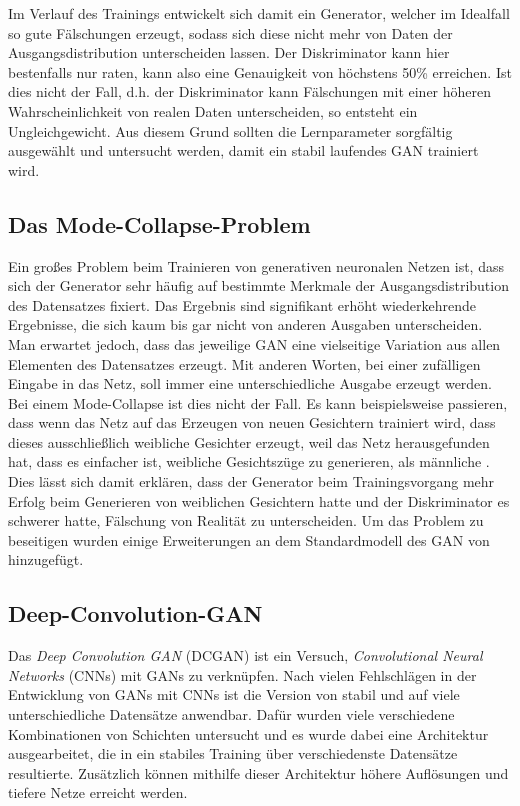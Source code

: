 Im Verlauf des Trainings entwickelt sich damit ein Generator, welcher im
Idealfall so gute Fälschungen erzeugt, sodass sich diese nicht mehr von Daten
der Ausgangsdistribution unterscheiden lassen. Der Diskriminator kann hier
bestenfalls nur raten, kann also eine Genauigkeit von höchstens 50\%
erreichen. Ist dies nicht der Fall, d.h. der Diskriminator kann Fälschungen
mit einer höheren Wahrscheinlichkeit von realen Daten unterscheiden, so
entsteht ein Ungleichgewicht. Aus diesem Grund sollten die Lernparameter
sorgfältig ausgewählt und untersucht werden, damit ein stabil laufendes GAN
trainiert wird.

\subsection{Das Mode-Collapse-Problem}
Ein großes Problem beim Trainieren von generativen neuronalen Netzen ist, dass
sich der Generator sehr häufig auf bestimmte Merkmale der Ausgangsdistribution
des Datensatzes fixiert. Das Ergebnis sind signifikant erhöht wiederkehrende
Ergebnisse, die sich kaum bis gar nicht von anderen Ausgaben unterscheiden.
Man erwartet jedoch, dass das jeweilige GAN eine vielseitige Variation aus
allen Elementen des Datensatzes erzeugt. Mit anderen Worten, bei einer
zufälligen Eingabe in das Netz, soll immer eine unterschiedliche Ausgabe
erzeugt werden. Bei einem Mode-Collapse ist dies nicht der Fall. Es kann
beispielsweise passieren, dass wenn das Netz auf das Erzeugen von neuen
Gesichtern trainiert wird, dass dieses ausschließlich weibliche Gesichter
erzeugt, weil das Netz herausgefunden hat, dass es einfacher ist, weibliche
Gesichtszüge zu generieren, als männliche \cite{richardson2018gans}. Dies
lässt sich damit erklären, dass der Generator beim Trainingsvorgang mehr
Erfolg beim Generieren von weiblichen Gesichtern hatte und der Diskriminator
es schwerer hatte, Fälschung von Realität zu unterscheiden. Um das Problem zu
beseitigen wurden einige Erweiterungen an dem Standardmodell des GAN von
\cite{goodfellow2014generative} hinzugefügt.

\subsection{Deep-Convolution-GAN}
Das \textit{Deep Convolution GAN} (DCGAN) ist ein Versuch,
\textit{Convolutional Neural Networks} (CNNs) mit GANs zu verknüpfen. Nach
vielen Fehlschlägen in der Entwicklung von GANs mit CNNs ist die Version von
\cite{radford2016unsupervised} stabil und auf viele unterschiedliche
Datensätze anwendbar. Dafür wurden viele verschiedene Kombinationen von
Schichten untersucht und es wurde dabei eine Architektur ausgearbeitet, die
in ein stabiles Training über verschiedenste Datensätze resultierte.
Zusätzlich können mithilfe dieser Architektur höhere Auflösungen und tiefere
Netze erreicht werden.

